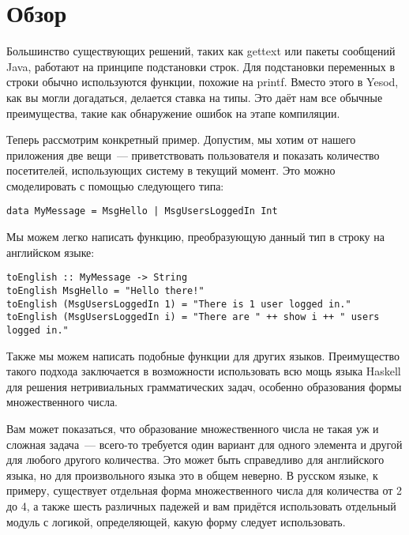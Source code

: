 
\section{Обзор}

Большинство существующих решений, таких как gettext или пакеты сообщений Java,
работают на принципе подстановки строк. Для подстановки переменных в строки
обычно используются функции, похожие на printf. Вместо этого в Yesod, как вы
могли догадаться, делается ставка на типы. Это даёт нам все обычные
преимущества, такие как обнаружение ошибок на этапе компиляции.

Теперь рассмотрим конкретный пример. Допустим, мы хотим от нашего приложения
две вещи~--- приветствовать пользователя и показать количество посетителей,
использующих систему в текущий момент. Это можно смоделировать с помощью
следующего типа:

\begin{lstlisting}
data MyMessage = MsgHello | MsgUsersLoggedIn Int
\end{lstlisting}

Мы можем легко написать функцию, преобразующую данный тип в строку на
английском языке:

\begin{lstlisting}
toEnglish :: MyMessage -> String
toEnglish MsgHello = "Hello there!"
toEnglish (MsgUsersLoggedIn 1) = "There is 1 user logged in."
toEnglish (MsgUsersLoggedIn i) = "There are " ++ show i ++ " users logged in."
\end{lstlisting}

Также мы можем написать подобные функции для других языков. Преимущество такого
подхода заключается в возможности использовать всю мощь языка Haskell для
решения нетривиальных грамматических задач, особенно образования формы
множественного числа.

\begin{remark}
    Вам может показаться, что образование множественного числа не такая уж и
    сложная задача~--- всего-то требуется один вариант для одного элемента и
    другой для любого другого количества. Это может быть справедливо для
    английского языка, но для произвольного языка это в общем неверно. В
    русском языке, к примеру, существует отдельная форма множественного числа
    для количества от 2 до 4, а также шесть различных падежей и вам придётся
    использовать отдельный модуль с логикой, определяющей, какую форму следует
    использовать.
\end{remark}

